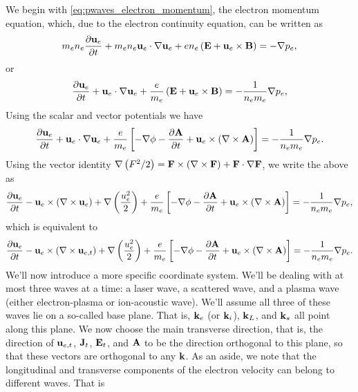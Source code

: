 \documentclass[a4paper,11pt]{report}
\begin{document}
We begin with \cref{eq:pwaves_electron_momentum}, the electron momentum equation, which, due to the electron continuity equation, can be written as
\begin{equation*}
    m_e n_e \frac{\partial\mathbf{u}_e}{\partial t} + m_e n_e \mathbf{u}_e \cdot \nabla \mathbf{u}_e + e n_e \left ( \mathbf{E} + \mathbf{u}_e \times \mathbf{B} \right ) = -\nabla p_e,
\end{equation*}
or
\begin{equation*}
    \frac{\partial\mathbf{u}_e}{\partial t} + \mathbf{u}_e \cdot \nabla \mathbf{u}_e + \frac{e}{m_e} \left ( \mathbf{E} + \mathbf{u}_e \times \mathbf{B} \right ) = -\frac{1}{n_e m_e}\nabla p_e,
\end{equation*}
Using the scalar and vector potentials we have
\begin{equation*}
    \frac{\partial\mathbf{u}_e}{\partial t} + \mathbf{u}_e \cdot \nabla \mathbf{u}_e +\frac{e}{m_e} \left [ -\nabla \phi - \frac{\partial \mathbf{A}}{\partial t} + \mathbf{u}_e \times \left ( \nabla \times \mathbf{A} \right ) \right ] = -\frac{1}{n_e m_e} \nabla p_e.
\end{equation*}
Using the vector identity $\nabla \left ( F^2 / 2 \right ) = \mathbf{F} \times \left ( \nabla \times \mathbf{F} \right ) + \mathbf{F} \cdot \nabla \mathbf{F}$, we write the above as
\begin{equation}
    \frac{\partial\mathbf{u}_e}{\partial t} - \mathbf{u}_e \times \left ( \nabla \times \mathbf{u}_e \right ) + \nabla \left (\frac{u_e^2}{2} \right ) + \frac{e}{m_e} \left [ -\nabla \phi - \frac{\partial \mathbf{A}}{\partial t} + \mathbf{u}_e \times \left ( \nabla \times \mathbf{A} \right ) \right ] = -\frac{1}{n_e m_e} \nabla p_e,
\end{equation}
which is equivalent to 
\begin{equation}
    \label{eq:emp_electron_momentum}
    \frac{\partial\mathbf{u}_e}{\partial t} - \mathbf{u}_e \times \left ( \nabla \times \mathbf{u}_{e,t} \right ) + \nabla \left (\frac{u_e^2}{2} \right ) + \frac{e}{m_e} \left [ -\nabla \phi - \frac{\partial \mathbf{A}}{\partial t} + \mathbf{u}_e \times \left ( \nabla \times \mathbf{A} \right ) \right ] = -\frac{1}{n_e m_e} \nabla p_e.
\end{equation}
We'll now introduce a more specific coordinate system. We'll be dealing with at most three waves at a time: a laser wave, a scattered wave, and a plasma wave (either electron-plasma or ion-acoustic wave). We'll assume all three of these waves lie on a so-called base plane. That is, $\mathbf{k}_e$ (or $\mathbf{k}_i$), $\mathbf{k}_L$, and $\mathbf{k}_s$ all point along this plane. We now choose the main transverse direction, that is, the direction of $\mathbf{u}_{e,t}$, $\mathbf{J}_t$, $\mathbf{E}_t$, and $\mathbf{A}$ to be the direction orthogonal to this plane, so that these vectors are orthogonal to any $\mathbf{k}$. As an aside, we note that the longitudinal and transverse components of the electron velocity can belong to different waves. That is
\end{document}
